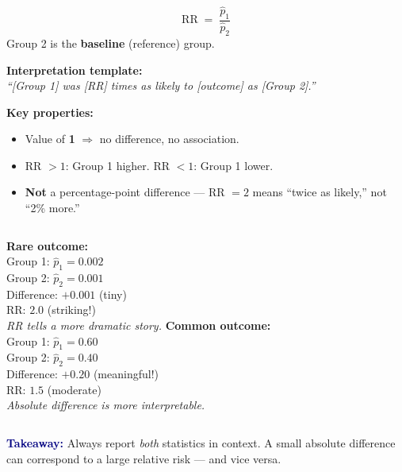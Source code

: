 \documentclass[aspectratio=169, 11pt]{beamer}
\begin{document}
\begin{frame}[t, plain]
  \vspace{0.3cm}
  \[
    \text{RR} \;=\; \frac{\hat{p}_1}{\hat{p}_2}
  \]
  Group 2 is the \textbf{baseline} (reference) group.

  \vspace{0.3cm}
  \textbf{Interpretation template:}\\[0.2cm]
  \textit{``[Group 1] was [RR] times as likely to [outcome] as [Group 2].''}

  \vspace{0.5cm}
  \textbf{Key properties:}
  \begin{itemize}
    \item Value of \textbf{1} $\Rightarrow$ no difference, no association.
    \item RR $> 1$: Group 1 higher. \quad RR $< 1$: Group 1 lower.
    \item \textbf{Not} a percentage-point difference --- RR $= 2$ means ``twice as likely,'' not ``2\% more.''
  \end{itemize}
\end{frame}

\begin{frame}[t, plain]
  \vspace{0.3cm}
  \begin{columns}
      \textbf{Rare outcome:}\\
      Group 1: $\hat{p}_1 = 0.002$ \\
      Group 2: $\hat{p}_2 = 0.001$ \\[0.3cm]
      Difference: $+0.001$ (tiny)\\
      RR: $2.0$ (striking!)\\[0.3cm]
      \textit{RR tells a more dramatic story.}
      \textbf{Common outcome:}\\
      Group 1: $\hat{p}_1 = 0.60$ \\
      Group 2: $\hat{p}_2 = 0.40$ \\[0.3cm]
      Difference: $+0.20$ (meaningful!)\\
      RR: $1.5$ (moderate)\\[0.3cm]
      \textit{Absolute difference is more interpretable.}
  \end{columns}
  \vspace{0.5cm}
  \textcolor{navy}{\bfseries Takeaway:} Always report \emph{both} statistics in context.
  A small absolute difference can correspond to a large relative risk --- and vice versa.
\end{frame}
\end{document}
